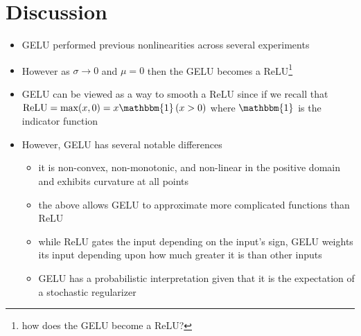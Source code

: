 \section{Discussion}
    \begin{itemize}
        \item GELU performed previous nonlinearities across several experiments
        \item However as \(\sigma \to 0 \) and $\mu=0$ then the GELU becomes a ReLU\footnote{how does the GELU become a ReLU?}
        \item GELU can be viewed as a way to smooth a ReLU since if we recall that \(\text{ReLU} = \text{max}(x, 0) = x \mathbbm{1}\left(x > 0\right)\) where \(\mathbbm{1} \) is the indicator function
        \item However, GELU has several notable differences
            \begin{itemize}
                \item it is non-convex, non-monotonic, and non-linear in the positive domain and exhibits curvature at all points
                \item the above allows GELU to approximate more complicated functions than ReLU
                \item while ReLU gates the input depending on the input's sign, GELU weights its input depending upon how much greater it is than other inputs
                \item GELU has a probabilistic interpretation given that it is the expectation of a stochastic regularizer
            \end{itemize}
    \end{itemize}

